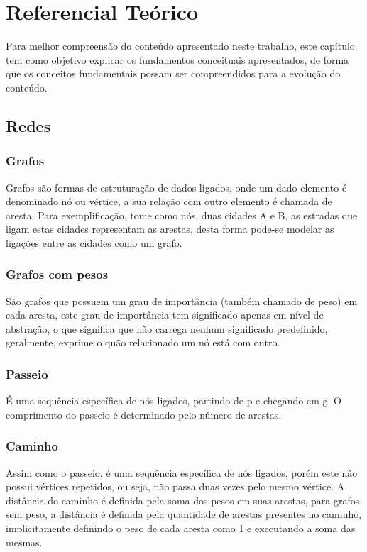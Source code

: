 \chapter{Referencial Teórico}

	 
\par
    Para melhor compreensão do conteúdo apresentado neste trabalho, este capítulo tem como objetivo explicar os fundamentos conceituais apresentados, de forma que os conceitos fundamentais possam ser compreendidos para a evolução do conteúdo.
    
\section{Redes}

\subsection{Grafos}
Grafos são formas de estruturação de dados ligados, onde um dado elemento é denominado nó ou vértice, a sua relação com outro elemento é chamada de aresta.
Para exemplificação, tome como nós, duas cidades A e B, as estradas que ligam estas cidades representam as arestas, desta forma pode-se modelar as ligações entre as cidades como um grafo.


\subsection{Grafos com pesos}
São grafos que possuem um grau de importância (também chamado de peso) em cada aresta, este grau de importância tem significado apenas em nível de abstração, o que significa que não carrega nenhum significado predefinido, geralmente, exprime o quão relacionado um nó está com outro.


\subsection{Passeio}
É uma sequência específica de nós ligados, partindo de p e chegando em g. O comprimento do passeio é determinado pelo número de arestas.

\subsection{Caminho}
Assim como o passeio, é uma sequência específica de nós ligados, porém este não possui vértices repetidos, ou seja, não passa duas vezes pelo mesmo vértice. A distância do caminho é definida pela soma dos pesos em suas arestas, para grafos sem peso, a distância é definida pela quantidade de arestas presentes no caminho, implicitamente definindo o peso de cada aresta como 1 e executando a soma das mesmas. 

